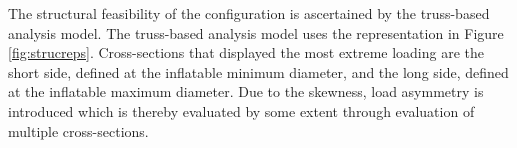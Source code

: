 

The structural feasibility of the configuration is ascertained by the truss-based analysis model. The truss-based analysis model uses the representation in Figure \ref{fig:strucreps}. Cross-sections that displayed the most extreme loading are the short side, defined at the inflatable minimum diameter, and the long side, defined at the inflatable maximum diameter. Due to the skewness, load asymmetry is introduced which is thereby evaluated by some extent through evaluation of multiple cross-sections.

